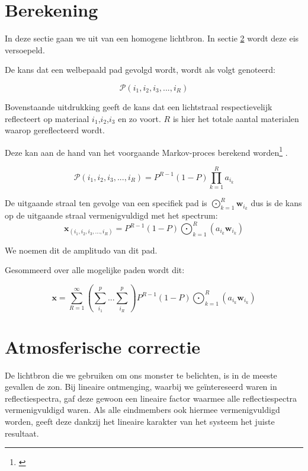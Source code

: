 \documentclass[12pt]{report}
\newcommand{\footcite}[1]{\cite{#1}\let\thefootnote\relax \footnote{\cite{#1} \bibentry{#1}} }
\DeclareMathOperator*{\Odot}{\bigodot}
\begin{document}
\section{Berekening}

In deze sectie gaan we uit van een homogene lichtbron. In sectie \ref{sec:at_cor} wordt deze eis versoepeld.

De kans dat een welbepaald pad gevolgd wordt, wordt als volgt genoteerd:

\begin{equation}
\mathcal{P}(i_1,i_2,i_3,...,i_R)
\end{equation}

Bovenstaande uitdrukking geeft de kans dat een lichtstraal respectievelijk reflecteert op materiaal 
$i_1$,$i_2$,$i_3$ en zo voort. $R$ is hier het totale aantal materialen waarop gereflecteerd wordt.

Deze kan aan de hand van het voorgaande Markov-proces berekend worden\footcite{mlinmix}. 

\begin{equation}
\mathcal{P}(i_1,i_2,i_3,...,i_R) = P^{R-1} (1-P) \prod_{k=1}^R a_{i_k}
\end{equation}

De uitgaande straal ten gevolge van een specifiek pad is 
$\Odot_{k=1}^R \bm{w}_{i_k}$ dus is de kans op de uitgaande straal vermenigvuldigd met het spectrum:
\begin{equation}
\bm{x}_{(i_1,i_2,i_3,...,i_R)} = P^{R-1} (1-P) \Odot_{k=1}^R \left(a_{i_k} \bm{w}_{i_k}\right)
\end{equation}

We noemen dit de amplitudo van dit pad.

Gesommeerd over alle mogelijke paden wordt dit:

\begin{equation}
\bm{x} = \sum_{R=1}^{\infty} \left(\sum_{i_1}^{p} ... \sum_{i_R}^{p}\right)P^{R-1} (1-P) \Odot_{k=1}^R \left(a_{i_k} \bm{w}_{i_k}\right)
\end{equation}

\section{Atmosferische correctie} \label{sec:at_cor}

De lichtbron die we gebruiken om ons monster te belichten, is in de meeste gevallen de zon. Bij lineaire ontmenging, waarbij we ge\"intereseerd waren in reflectiespectra, gaf deze gewoon een lineaire factor waarmee alle reflectiespectra vermenigvuldigd waren. Als alle eindmembers ook hiermee vermenigvuldigd worden, geeft deze dankzij het lineaire karakter van het systeem het juiste resultaat.
\end{document}
